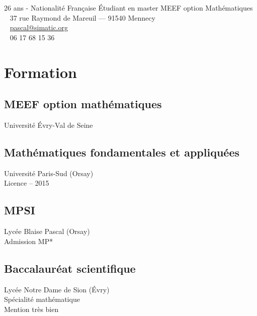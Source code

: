 \documentclass[]{cv-template}
\begin{document}
%
%
{26 ans - Nationalité Française}
{Étudiant en master MEEF option Mathématiques}
{\faHome ~ 37 rue Raymond de Mareuil --- 91540 Mennecy \\
  \faEnvelope ~ \href{mailto:pascal@simatic.org}{pascal@simatic.org}\\
  \faPhone  ~  06 17 68 15 36}

%
%
\begin{minipage}[t]{0.34\textwidth} 

\section{Formation} 

\subsection{MEEF option mathématiques}
\mycaret Université Évry-Val de Seine
\sectionsep

\subsection{Mathématiques fondamentales \newline et appliquées}
\mycaret Université Paris-Sud (Orsay)\\
\mycaret Licence -- 2015
\sectionsep

\subsection{MPSI}
\mycaret Lycée Blaise Pascal (Orsay)\\
\mycaret Admission MP*
\sectionsep

\subsection{Baccalauréat scientifique}
\mycaret Lycée Notre Dame de Sion (\'Evry) \\
\mycaret Spécialité mathématique \\
\mycaret Mention très bien
\sectionsep


\end{minipage}
\end{document}
